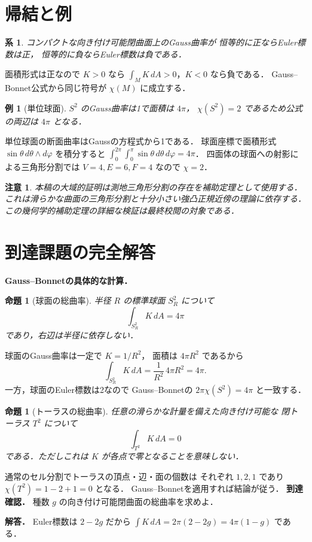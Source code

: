 \documentclass[a5paper,10pt,onecolumn]{jsarticle}
\makeatletter
\theoremstyle{mathnotetheorem}
\newtheorem{proposition}[theorem]{命題}
\newtheorem{corollary}[theorem]{系}
\newtheorem{example}[theorem]{例}
\newtheorem{remark}[theorem]{注意}
\renewcommand{\proofname}{証明}
\renewenvironment{proof}[1][\proofname]{%
  \par\pushQED{\qed}\normalfont\topsep4\p@\@plus2\p@\relax
  \trivlist\item[\hskip\labelsep\bfseries #1]\ignorespaces
}{\popQED\endtrivlist\@endpefalse}
\makeatother
\begin{document}
\section{帰結と例}
\begin{corollary}
コンパクトな向き付け可能閉曲面上のGauss曲率が
恒等的に正ならEuler標数は正，
恒等的に負ならEuler標数は負である．
\end{corollary}
\begin{proof}
面積形式は正なので
$K>0$ なら $\int_MK\,dA>0$，$K<0$ なら負である．
Gauss--Bonnet公式から同じ符号が $\chi(M)$ に成立する．
\end{proof}
\begin{example}[単位球面]
$S^2$ のGauss曲率は1で面積は $4\pi$，
$\chi(S^2)=2$ であるため公式の両辺は $4\pi$ となる．
\end{example}
\begin{proof}
単位球面の断面曲率はGaussの方程式から1である．
球面座標で面積形式
$\sin\theta\,d\theta\wedge d\varphi$ を積分すると
$\int_0^{2\pi}\int_0^\pi\sin\theta\,d\theta\,d\varphi=4\pi$．
四面体の球面への射影による三角形分割では
$V=4,E=6,F=4$ なので $\chi=2$．
\end{proof}
\begin{remark}
本稿の大域的証明は測地三角形分割の存在を補助定理として使用する．
これは滑らかな曲面の三角形分割と十分小さい強凸正規近傍の理論に依存する．
この幾何学的補助定理の詳細な検証は最終校閲の対象である．
\end{remark}

\section{到達課題の完全解答}
\noindent\textbf{Gauss--Bonnetの具体的な計算．}
\begin{proposition}[球面の総曲率]
半径 $R$ の標準球面 $S_R^2$ について
\[
\int_{S_R^2}K\,dA=4\pi
\]
であり，右辺は半径に依存しない．
\end{proposition}
\begin{proof}
球面のGauss曲率は一定で $K=1/R^2$，
面積は $4\pi R^2$ であるから
\[
\int_{S_R^2}K\,dA
=\frac1{R^2}\,4\pi R^2=4\pi.
\]
一方，球面のEuler標数は2なので
Gauss--Bonnetの $2\pi\chi(S^2)=4\pi$ と一致する．
\end{proof}
\begin{proposition}[トーラスの総曲率]
任意の滑らかな計量を備えた向き付け可能な
閉トーラス $T^2$ について
\[
\int_{T^2}K\,dA=0
\]
である．ただしこれは $K$ が各点で零となることを意味しない．
\end{proposition}
\begin{proof}
通常のセル分割でトーラスの頂点・辺・面の個数は
それぞれ $1,2,1$ であり
$\chi(T^2)=1-2+1=0$ となる．
Gauss--Bonnetを適用すれば結論が従う．
\end{proof}
\noindent\textbf{到達確認．}
種数 $g$ の向き付け可能閉曲面の総曲率を求めよ．
\par\noindent\textbf{解答．}
Euler標数は $2-2g$ だから
$\int K\,dA=2\pi(2-2g)=4\pi(1-g)$ である．
\end{document}
